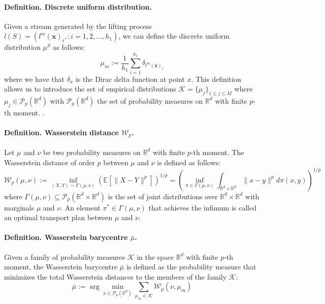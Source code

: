 \documentclass[12pt,a4paper]{report}
\begin{document}
\paragraph{Definition. Discrete uniform distribution.}
Given a stream generated by the lifting process $l(S) = (l^m(\mathbf{x})_i, : i = 1, 2, \dots, h_1)$, we can define the discrete uniform distribution $\mu^S$ as follows:
\begin{equation}
\mu_m := \frac{1}{h_1} \sum_{i=1}^{h_1} \delta_{l^m(\mathbf{x})_i}
\end{equation}
where we have that $\delta_x$ is the Dirac delta function at point $x$. \cite{LuanHamp2025}
This definition allows us to introduce the set of empirical distributions $\mathcal{K} = \{\mu_j\}_{1 \le j \le M}$ where $\mu_j \in \mathcal{P}_p(\mathbb{R}^d)$ with $\mathcal{P}_p(\mathbb{R}^d)$ the set of probability measures on $\mathbb{R}^d$ with finite $p$-th moment. \cite{LuanHamp2025}. 


\paragraph{Definition. Wasserstein distance $\mathcal{W}_p$.}
Let $\mu$ and $\nu$ be two probability measures on $\mathbb{R}^d$ with finite $p$-th moment. The Wasserstein distance of order $p$ between $\mu$ and $\nu$ is defined as follows:
\begin{equation}
\mathcal{W}_p(\mu, \nu) :=  \inf_{(X,Y) \sim \Gamma(\mu, \nu)} \left( \mathbb{E}\left[ \|X - Y\|^p \right] \right)^{1/p} = \left( \inf_{\pi \in \Gamma(\mu, \nu)} \int_{\mathbb{R}^d \times \mathbb{R}^d} \|x - y\|^p d\pi(x,y) \right)^{1/p}
\end{equation}
where $\Gamma(\mu, \nu) \subseteq \mathcal{P}_p(\mathbb{R}^d \times \mathbb{R}^d)$ is the set of joint distributions over $\mathbb{R}^d \times \mathbb{R}^d$ with marginals $\mu$ and $\nu$. An element $\pi^*\in \Gamma(\mu, \nu)$ that achieves the infimum is called an optimal transport plan between $\mu$ and $\nu$. \cite{RowlandEtAl2019}


\paragraph{Definition. Wasserstein barycentre $\bar{\mu}$.}
Given a family of probability measures $\mathcal{K}$ in the space $\mathbb{R}^d$ with finite $p$-th moment, the Wasserstein barycentre $\bar{\mu}$ is defined as the probability measure that minimizes the total Wasserstein distances to the members of the family $\mathcal{K}$:
\begin{equation}
\bar{\mu} := \arg\min_{\nu \in \mathcal{P}_p(\mathbb{R}^d)} \sum_{\mu_m \in \mathcal{K}} \mathcal{W}_p(\nu, \mu_m)
\end{equation}
\end{document}
